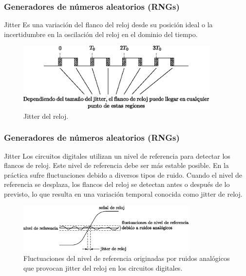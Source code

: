 \documentclass[10pt]{beamer}
\begin{document}
\begin{frame}
    \frametitle{Generadores de números aleatorios (RNGs)}
    \begin{block}{Jitter}
        \justifying
         Es una variación del flanco del reloj desde su posición ideal o la incertidumbre en la oscilación del reloj en el dominio del tiempo.
	\end{block}
	\begin{figure}[hbtp]
        \centering
        \includegraphics[width=0.9\textwidth]{F9_jitter}
        \caption{Jitter del reloj.}
        \label{fig:F9_jitter}
    \end{figure}
\end{frame}


\begin{frame}
    \frametitle{Generadores de números aleatorios (RNGs)}
    \begin{block}{Jitter}
        \justifying
         Los circuitos digitales utilizan un nivel de referencia para detectar los flancos de reloj. Este nivel de referencia debe ser más estable posible. En la práctica sufre fluctuaciones debido a diversos tipos de ruido. Cuando el nivel de referencia se desplaza, los flancos del reloj se detectan antes o después de lo previsto, lo que resulta en una variación temporal conocida como jitter de reloj.
	\end{block}
    \begin{figure}[hbtp]
        \centering
        \includegraphics[width=0.8\textwidth]{F10_fluctuaciones}
        \caption{Fluctuaciones del nivel de referencia originadas por ruidos analógicos que provocan jitter del reloj en los circuitos digitales. \cite{Petura2019}}
        \label{fig:F10_fluctuaciones}
    \end{figure}
\end{frame}
\end{document}
